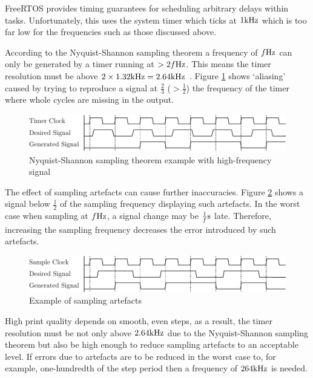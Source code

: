 				FreeRTOS provides timing guarantees for scheduling arbitrary delays
				within tasks. Unfortunately, this uses the system timer which ticks at
				$1\textrm{kHz}$ which is too far low for the frequencies such as those discussed
				above. 
				
				According to the Nyquist-Shannon sampling theorem a frequency of $f\textrm{Hz}$
				can only be generated by a timer running at $> 2f\textrm{Hz}$. This means the
				timer resolution must be above $2 \times 1.32\textrm{kHz} = 2.64\textrm{kHz}$
				\cite{shannon}. Figure \ref{fig:nyquist} shows `aliasing' caused by
				trying to reproduce a signal at $\frac{2}{3}$ ($> \frac{1}{2}$) the
				frequency of the timer where whole cycles are missing in the output.
				
				\begin{figure}
					\includegraphics[width=1\textwidth]{diagrams/nyquist.pdf}
					\caption{Nyquist-Shannon sampling theorem example with high-frequency
					signal}
					\label{fig:nyquist}
				\end{figure}
				
				The effect of sampling artefacts can cause further inaccuracies. Figure
				\ref{fig:artefacts} shows a signal below $\frac{1}{2}$ of the sampling
				frequency displaying such artefacts. In the worst case when sampling at
				$f\textrm{Hz}$, a signal change may be $\frac{1}{f}\textrm{s}$ late. Therefore,
				increasing the sampling frequency decreases the error introduced by such
				artefacts.
				
				\begin{figure}
					\includegraphics[width=1\textwidth]{diagrams/artefacts.pdf}
					\caption{Example of sampling artefacts}
					\label{fig:artefacts}
				\end{figure}
				
				High print quality depends on smooth, even steps, as a result, the timer
				resolution must be not only above $2.64\textrm{kHz}$ due to the Nyquist-Shannon
				sampling theorem but also be high enough to reduce sampling artefacts to
				an acceptable level. If errors due to artefacts are to be reduced in the
				worst case to, for example, one-hundredth of the step period then a
				frequency of $264\textrm{kHz}$ is needed.
				
